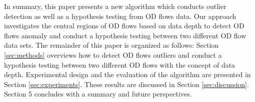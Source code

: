 \documentclass[a4paper,UKenglish]{lipics-v2016}
\begin{document}
In summary, this paper presents a new algorithm which conducts outlier detection as well as a hypothesis testing from OD flows data. Our approach investigates the central regions of OD flows based on data depth to detect OD flows anomaly and conduct a hypothesis testing between two different OD flow data sets. The remainder of this paper is organized as follows: Section \ref{sec:methods} overviews how to detect OD flows outliers and conduct  a hypothesis testing between two different OD flows with the concept of data depth. 
Experimental design and the evaluation of the algorithm are presented in Section \ref{sec:experiments}. 
These results are discussed in Section \ref{sec:discussion}. 
Section 5 concludes with a summary and future perspectives.

\end{document}
